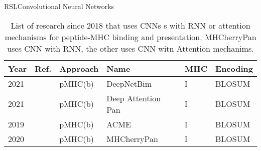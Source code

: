 \documentclass[10pt]{beamer}
\newcommand{\1}{
	\setbeamertemplate{background}{
		\texttt{[image: img/1]}
		\tikz[overlay] \fill[fill opacity=0.75,fill=white] (0,0) rectangle (-\paperwidth,\paperheight);
	}
}
\begin{document}
\begin{frame}{RSL}{Convolutional Neural Networks}
	
	\fontsize{8pt}{5pt}\selectfont
	
	\begin{table}[]
		\centering
		\caption{List of research since 2018 that uses CNNs s with RNN or attention mechanisms for peptide-MHC binding and presentation. MHCherryPan uses CNN with RNN, the other uses CNN witn Attention mechanims.}		
		\setlength{\tabcolsep}{0.5em} %
		{\renewcommand{\arraystretch}{2}%
			\begin{tabular}{p{0.6cm}p{0.6cm}p{1.5cm}p{2cm}p{0.6cm}p{2.7cm}}
			\textbf{Year} & \textbf{Ref.}                              & \textbf{Approach}   & \textbf{Name}    & \textbf{MHC} & \textbf{Encoding}                                           \\ \hline
			2021          & \cite{yang2021deepnetbim} & pMHC(b) & DeepNetBim       & I        & BLOSUM              \\
			
			2021          & \cite{jin2021deep}        & pMHC(b) & Deep Attention Pan & I        & BLOSUM                    \\
			
			2019          & \cite{hu2019acme}         & pMHC(b) & ACME             & I        & BLOSUM      \\
			
			2020          & \cite{xie2020mhcherrypan} & pMHC(b) & MHCherryPan      & I        & BLOSUM          
		\end{tabular}
		}
	\end{table}	
\end{frame}
\end{document}
